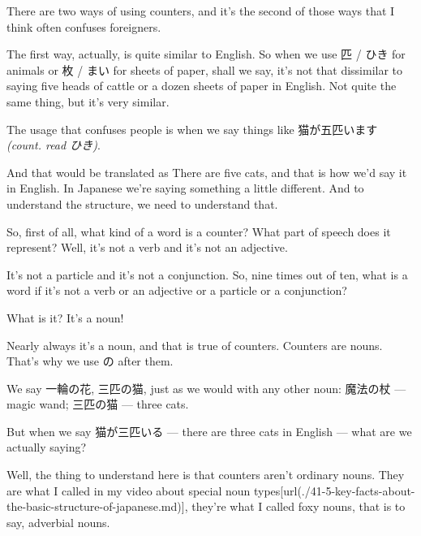 There are two ways of using counters, and it's the second of those ways that I think often confuses foreigners.

\stopsectionlevel

\startsectionlevel[title={Two ways of using counters},reference={two-ways-of-using-counters}]

The first way, actually, is quite similar to English. So when we use 匹 / ひき for animals or 枚 / まい for sheets of paper, shall we say, it's not that dissimilar to saying five heads of cattle or a dozen sheets of paper in English. Not quite the same thing, but it's very similar.

\startsectionlevel[title={The second use},reference={the-second-use}]

The usage that confuses people is when we say things like 猫が五匹います {\em (count. read ひき)}.

{}

And that would be translated as There are five cats, and that is how we'd say it in English. In Japanese we're saying something a little different. And to understand the structure, we need to understand that.

So, first of all, what kind of a word is a counter? What part of speech does it represent? Well, it's not a verb and it's not an adjective.

It's not a particle and it's not a conjunction. So, nine times out of ten, what is a word if it's not a verb or an adjective or a particle or a conjunction?

What is it? It's a noun!

{}

Nearly always it's a noun, and that is true of counters. Counters are nouns. That's why we use の after them.

We say 一輪の花, 三匹の猫, just as we would with any other noun: 魔法の杖 --- magic wand; 三匹の猫 --- three cats.

\thinrule

But when we say 猫が三匹いる --- there are three cats in English --- what are we actually saying?

{}

Well, the thing to understand here is that counters aren't ordinary nouns. They are what I called in my video about special noun types\goto{{[}41{]}}[url(./41-5-key-facts-about-the-basic-structure-of-japanese.md)], they're what I called foxy nouns, that is to say, adverbial nouns.


